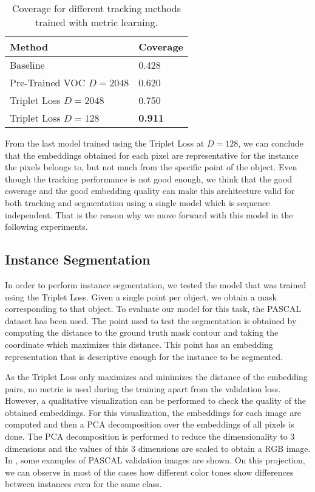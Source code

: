 \begin{table}[h]
  \centering
  \begin{tabular}{l|l}
    \toprule
    Method                   & Coverage       \\
    \midrule
    Baseline                 & 0.428          \\
    Pre-Trained VOC $D=2048$ & 0.620          \\
    Triplet Loss $D=2048$    & 0.750          \\
    Triplet Loss $D=128$     & \textbf{0.911} \\
    \bottomrule
  \end{tabular}
  \caption{Coverage for different tracking methods trained with metric learning. }
  \label{tab:experiments:tracking:coveragemetriclearning}
\end{table}

From the last model trained using the Triplet Loss at $D=128$, we can conclude that the embeddings obtained for each pixel are representative for the instance the pixels belongs to, but not much from the specific point of the object.
Even though the tracking performance is not good enough, we think that the good coverage and the good embedding quality can make this architecture valid for both tracking and segmentation using a single model which is sequence independent.
That is the reason why we move forward with this model in the following experiments.



\subsection{Instance Segmentation}

In order to perform instance segmentation, we tested the model that was trained using the Triplet Loss.
Given a single point per object, we obtain a mask corresponding to that object.
To evaluate our model for this task, the PASCAL~\pascal{} dataset has been used.
The point used to test the segmentation is obtained by computing the distance to the ground truth mask contour and taking the coordinate which maximizes this distance.
This point has an embedding representation that is descriptive enough for the instance to be segmented.

As the Triplet Loss only maximizes and minimizes the distance of the embedding pairs, no metric is used during the training apart from the validation loss.
However, a qualitative visualization can be performed to check the quality of the obtained embeddings.
For this visualization, the embeddings for each image are computed  and then a PCA decomposition over the embeddings of all pixels is done.
The PCA decomposition is performed to reduce the dimensionality to 3 dimensions and the values of this 3 dimensions are scaled to obtain a RGB image.
In , some examples of PASCAL validation images are shown.
On this projection, we can observe in most of the cases how different color tones show differences between instances even for the same class.

